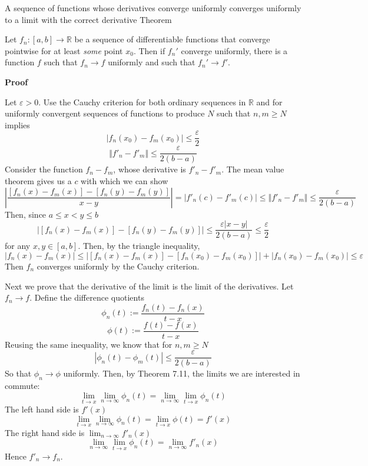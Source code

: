 \begin{result}
    {A sequence of functions whose derivatives converge uniformly converges uniformly to a limit with the correct derivative}
    {Theorem}

    Let $f_n: [a,b] \rightarrow \mathbb{R}$ be a sequence of differentiable functions that converge pointwise for at least \textit{some} point $x_0$. Then if $f_n'$ converge uniformly, there is a function $f$ such that $f_n \rightarrow f$ uniformly and such that $f_n' \rightarrow f'$.

    \textbf{Proof}

    Let $\varepsilon > 0$. Use the Cauchy criterion for both ordinary sequences in $\mathbb{R}$ and for uniformly convergent sequences of functions to produce $N$ such that $n, m \geq N$ implies
    \[|f_n(x_0) - f_m(x_0)| \leq \frac{\varepsilon}{2}\]
    \[\Vert f'_n - f'_m \Vert \leq \frac{\varepsilon}{2(b-a)}\]
    Consider the function $f_n - f_m$, whose derivative is $f'_n - f'_m$. The mean value theorem gives us a $c$ with which we can show
    \[\left|\frac{[f_n(x) - f_m(x)] - [f_n(y) - f_m(y)]}{x-y}\right| = |f'_n(c) - f'_m(c)| \leq \Vert f'_n - f'_m \Vert \leq \frac{\varepsilon}{2(b-a)}\]
    Then, since $a \leq x < y \leq b$
    \[\left|[f_n(x) - f_m(x)] - [f_n(y) - f_m(y)]\right| \leq \frac{\varepsilon|x-y|}{2(b-a)} \leq \frac{\varepsilon}{2}\]
    for any $x, y \in [a, b]$. Then, by the triangle inequality,
    \[|f_n(x) - f_m(x)| \leq |[f_n(x) - f_m(x)] - [f_n(x_0) - f_m(x_0)]| + |f_n(x_0) - f_m(x_0)| \leq \varepsilon\]
    Then $f_n$ converges uniformly by the Cauchy criterion.

    Next we prove that the derivative of the limit is the limit of the derivatives. Let $f_n \rightarrow f$. Define the difference quotients
    \[\phi_n(t) := \frac{f_n(t) - f_n(x)}{t-x}\]
    \[\phi(t) := \frac{f(t) - f(x)}{t-x}\]
    Reusing the same inequality, we know that for $n, m \geq N$
    \[|\phi_n(t) - \phi_m(t)| \leq \frac{\varepsilon}{2(b-a)}\]
    So that $\phi_n \rightarrow \phi$ uniformly. Then, by Theorem 7.11, the limits we are interested in commute:
    \[\lim_{t \to x} \lim_{n \to \infty} \phi_n(t) = \lim_{n \to \infty} \lim_{t \to x} \phi_n(t)\]
    The left hand side is $f'(x)$
    \[\lim_{t \to x} \lim_{n \to \infty} \phi_n(t) = \lim_{t \to x} \phi(t) = f'(x)\]
    The right hand side is $\lim_{n\to\infty} f'_n(x)$
    \[\lim_{n \to \infty} \lim_{t \to x} \phi_n(t) = \lim_{n \to \infty} f'_n(x)\]
    Hence $f'_n \rightarrow f_n$.
\end{result}

